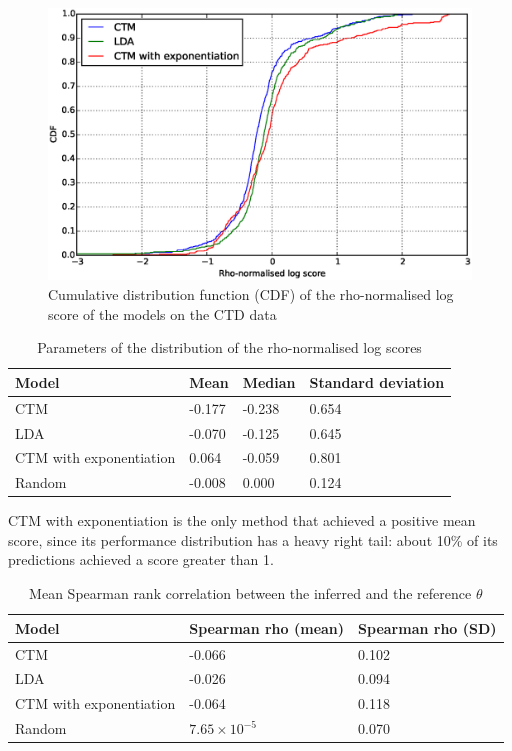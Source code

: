 \documentclass[12pt,a4paper,twoside,openright]{report}
\begin{document}
\begin{figure}[!htb]
\includegraphics[width=\textwidth]{ctd-rho-cdf.eps}
\caption{Cumulative distribution function (CDF) of the rho-normalised log score of the models on the CTD data}
\label{fig:ctd-rho-cdf}
\end{figure}

\begin{table}
\begin{tabular}{| l | l | l | l |}
\hline
Model & Mean & Median & Standard deviation\\
\hline
CTM & -0.177 & -0.238 & 0.654 \\
LDA & -0.070 & -0.125 & 0.645 \\
CTM with exponentiation & 0.064 & -0.059 & 0.801 \\
Random & -0.008 & 0.000 & 0.124 \\
\hline
\end{tabular}
\caption{Parameters of the distribution of the rho-normalised log scores}
\label{tab:ctm-cdf-summary}
\end{table}

CTM with exponentiation is the only method that achieved a positive mean score, since its performance distribution has a heavy right tail: about 10\% of its predictions achieved a score greater than 1.

\begin{table}
\begin{tabular}{| l | l | l |}
\hline
Model & Spearman rho (mean) & Spearman rho (SD) \\
\hline
CTM & -0.066 & 0.102\\
LDA & -0.026 & 0.094\\
CTM with exponentiation & -0.064 & 0.118 \\
Random & $7.65 \times 10^{-5}$ & 0.070 \\
\hline
\end{tabular}
\caption{Mean Spearman rank correlation between the inferred and the reference $\theta$}
\label{tab:ctd-spearman}
\end{table}
\end{document}
